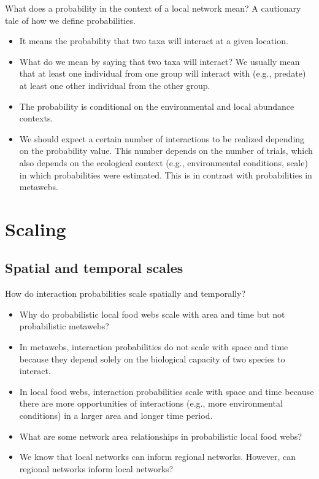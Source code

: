 \documentclass[10pt,oneside]{article}
\begin{document}
What does a probability in the context of a local network mean? A
cautionary tale of how we define probabilities.

\begin{itemize}
\tightlist
\item
  It means the probability that two taxa will interact at a given
  location.
\item
  What do we mean by saying that two taxa will interact? We usually mean
  that at least one individual from one group will interact with (e.g.,
  predate) at least one other individual from the other group.
\item
  The probability is conditional on the environmental and local
  abundance contexts.
\item
  We should expect a certain number of interactions to be realized
  depending on the probability value. This number depends on the number
  of trials, which also depends on the ecological context (e.g.,
  environmental conditions, scale) in which probabilities were
  estimated. This is in contrast with probabilities in metawebs.
\end{itemize}

\hypertarget{scaling}{%
\section{Scaling}\label{scaling}}

\hypertarget{spatial-and-temporal-scales}{%
\subsection{Spatial and temporal
scales}\label{spatial-and-temporal-scales}}

How do interaction probabilities scale spatially and temporally?

\begin{itemize}
\tightlist
\item
  Why do probabilistic local food webs scale with area and time but not
  probabilistic metawebs?
\item
  In metawebs, interaction probabilities do not scale with space and
  time because they depend solely on the biological capacity of two
  species to interact.
\item
  In local food webs, interaction probabilities scale with space and
  time because there are more opportunities of interactions (e.g., more
  environmental conditions) in a larger area and longer time period.
\item
  What are some network area relationships in probabilistic local food
  webs?
\item
  We know that local networks can inform regional networks. However, can
  regional networks inform local networks?
\end{itemize}
\end{document}
